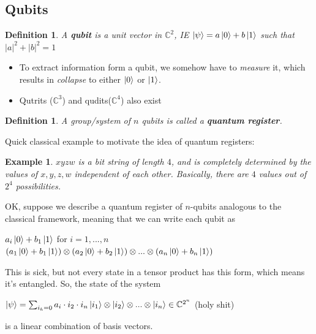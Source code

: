 \documentclass[12pt]{article}
\theoremstyle{plain}
\theoremstyle{nonumberplain}
\theoremstyle{plain}
\newtheorem{definition}[lemma]{Definition}
\newtheorem{example}[lemma]{Example}
\theoremstyle{nonumberplain}
\newcommand\1{{\bf 1}}
\newcommand{\C}{\mathbb{C}} %
\newcommand{\<}{\left\langle}
\renewcommand{\>}{\right\rangle}
\newcommand{\abs}[1]{\left\lvert #1 \right\rvert} %
\begin{document}
\subsection{Qubits}
\begin{definition}
A \textbf{qubit} is a unit vector in $\C^2$, IE
$\ket{\psi}=a\ket{0}+b\ket{1}$ such that $\abs{a}^2+\abs{b}^2=1$
\end{definition}
\begin{itemize}
\item To extract information form a qubit, we somehow have to \textit{measure} it, which results in \textit{collapse} to either $\ket{0}$ or $\ket{1}$.
\item Qutrits ($\C^3$) and qudits($\C^4$) also exist
\end{itemize}
\begin{definition}
A group/system of $n$ qubits is called a \textbf{quantum register}.
\end{definition}
Quick classical example to motivate the idea of quantum registers:
\begin{example}
$xyzw$ is a bit string of length $4$, and is completely determined by the values of $x,y,z,w$ independent of each other. Basically, there are $4$ values out of $2^4$ possibilities.
\end{example}
OK, suppose we describe a quantum register of $n$-qubits analogous to the classical framework, meaning that we can write each qubit as
\begin{center}
$a_i\ket{0}+b_1\ket{1}$ for $i=1,...,n$\\
$(a_1\ket{0}+b_1\ket{1})\otimes (a_2\ket{0}+b_2\ket{1})\otimes ...\otimes (a_n\ket{0}+b_n\ket{1})$
\end{center}
This is sick, but not every state in a tensor product has this form, which means it's entangled. So, the state of the system
\begin{center}
$\ket{\psi}=\sum_{i_k=0}a_i\cdot i_2 \cdot i_n \ket{i_1}\otimes \ket{i_2}\otimes ... \otimes \ket{i_n}\in\C^{2^n}$ (holy shit)
\end{center}
is a linear combination of basis vectors.
\end{document}
